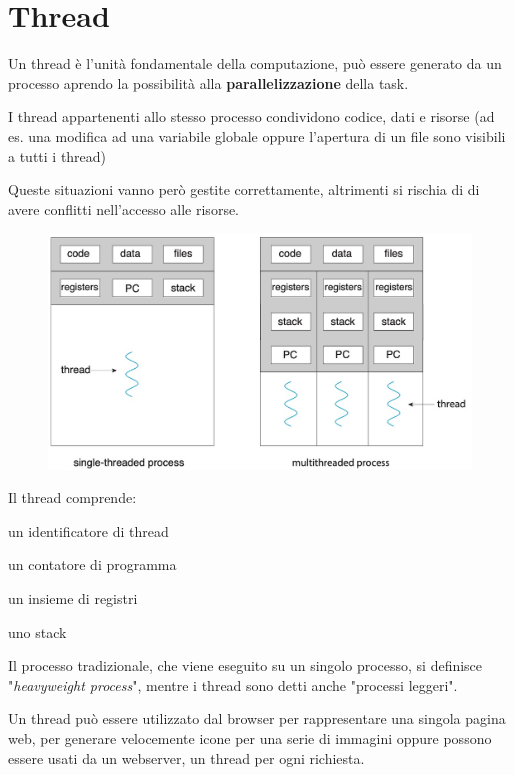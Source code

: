 \section{Thread}
Un thread è l'unità fondamentale della computazione, può essere generato da un processo aprendo la possibilità alla \textbf{parallelizzazione} della task.

\spacer
I thread appartenenti allo stesso processo condividono codice, dati e risorse (ad es. una modifica ad una variabile globale oppure l'apertura di un file sono visibili a tutti i thread)

Queste situazioni vanno però gestite correttamente, altrimenti si rischia di di avere conflitti nell'accesso alle risorse.

\begin{figure}[H]
    \centering
    \includegraphics[width=0.6\linewidth]{assets/multithread.jpg}
\end{figure}

\spacer

Il thread comprende:
\begin{sitemize}
    \item un identificatore di thread
    \item un contatore di programma
    \item un insieme di registri
    \item uno stack
\end{sitemize}

\begin{note}
    Il processo tradizionale, che viene eseguito su un singolo processo, si definisce "\textit{heavyweight process}", mentre i thread sono detti anche "processi leggeri".

    \spacer[4pt]

    Un thread può essere utilizzato dal browser per rappresentare una singola pagina web, per generare velocemente icone per una serie di immagini oppure possono essere usati da un webserver, un thread per ogni richiesta.
\end{note}

